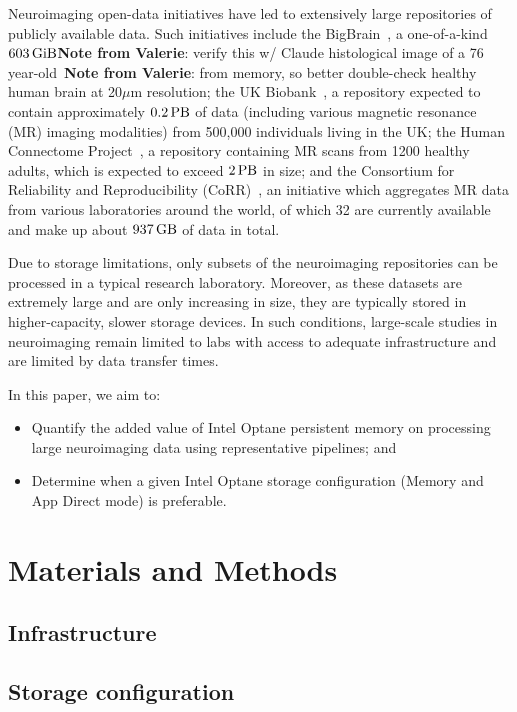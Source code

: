 \documentclass[conference]{IEEEtran}
\newcommand{\valerie}[1]{\color{blue}\textbf{Note from Valerie}:
      #1 \color{black}}
\begin{document}
Neuroimaging open-data initiatives have led to extensively large repositories of
publicly available data. Such initiatives include the BigBrain~\cite{BigBrain}, 
a one-of-a-kind $\SI{603}{\gibi\byte}$\valerie{verify this w/ Claude}
histological image of a 76 year-old~\valerie{from memory, so better double-check} healthy human brain
at 20$\mu$m resolution; the UK Biobank~\cite{ukbiobank}, a repository expected to
contain approximately $\SI{0.2}{\peta\byte}$ of data (including various magnetic
resonance (MR) imaging modalities) from 500,000 individuals living in the UK;
the Human Connectome Project~\cite{HCP}, a repository containing MR scans from
1200 healthy adults, which is expected to exceed $\SI{2}{\peta\byte}$ in size; 
and the Consortium for Reliability and Reproducibility (CoRR)~\cite{corr}, an
initiative which aggregates MR data from various laboratories around the world, 
of which 32 are currently available and make up about $\SI{937}{\giga\byte}$ of
data in total.

Due to storage limitations, only subsets of the neuroimaging repositories 
can be processed in a typical research laboratory. Moreover, as these datasets 
are extremely large and are only increasing in size, they are typically stored 
in higher-capacity, slower storage devices. In such conditions, large-scale 
studies in neuroimaging remain limited to labs with access to adequate 
infrastructure and are limited by data transfer times.

In this paper, we aim to:
\begin{itemize}
        \item Quantify the added value of Intel Optane persistent memory on 
            processing large neuroimaging data using representative pipelines; and
        \item Determine when a given Intel Optane storage configuration (Memory 
            and App Direct mode) is preferable.
\end{itemize}

\section{Materials and Methods}
\subsection{Infrastructure}
\subsection{Storage configuration}
\end{document}
